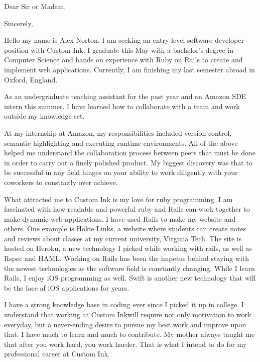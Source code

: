 \documentclass{my_cv}
\begin{document}
\newcommand{\companyName}{Custom Ink}
\recipient{\companyName \ Recruitment team}{\companyName }
\date{\today}
\opening{Dear Sir or Madam,}
\closing{Sincerely,}
\makelettertitle


\indent Hello my name is Alex Norton.   I am seeking an entry-level software developer
position with \companyName.   I graduate this May with a bachelor’s degree in
Computer Science and hands on experience with Ruby on Rails to create and
implement web applications.  Currently, I am finishing my last semester abroad
in Oxford, England. 

As an undergraduate teaching assistant for the past year and an Amazon SDE
intern this summer.  I have learned how to collaborate with a team and work
outside my knowledge set.

At my internship at Amazon, my responsibilities included version control,
semantic highlighting and executing runtime environments.  All of the above
helped me understand the collaboration process between peers that must be
done in order to carry out a finely polished product.  My biggest discovery
was that to be successful in any field hinges on your ability to work
diligently with your coworkers to constantly over achieve.

What attracted me to Custom Ink is my love for ruby programming.  I
am fascinated with how readable and powerful ruby and Rails can work together to
make dynamic web applications.  I have used Rails to make my website and others.
One example is Hokie Links, a website where students can create notes and
reviews about classes at my current university, Virginia Tech.  The site is
hosted on Heroku, a new technology I picked while working with rails, as well as
Rspec and HAML.  Working on Rails has been the impetus behind staying with
the newest technologies as the software field is constantly changing.  While I learn
Rails, I enjoy iOS programming as well.  Swift is another new technology that
will be the face af iOS applications for years.

I have a strong knowledge base in coding ever since I picked it up in
college.  I understand that working at \companyName will require not only
motivation to work everyday, but a never-ending desire to pursue my best
work and improve upon that.  I have much to learn and much to
contribute.  My mother always taught me that after you work hard, you
work harder.  That is what I intend to do for my professional career at
\companyName.
\end{document}
